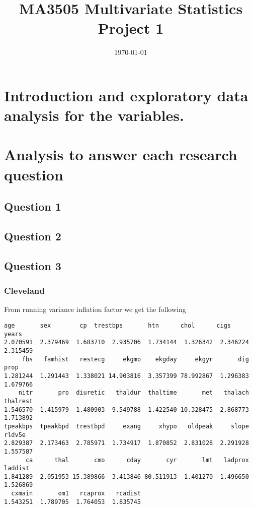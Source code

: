 \documentclass[a4paper]{article}
\title{MA3505 Multivariate Statistics Project 1}
\date{\today}
\begin{document}
\maketitle


\section{Introduction and exploratory data analysis for the variables.}


\section{Analysis to answer each research question}

\subsection{Question 1}


\subsection{Question 2}


\subsection{Question 3}

\subsubsection{Cleveland}

From running variance inflation factor we get the following

\begin{lstlisting}[frame=single]
     age       sex        cp  trestbps       htn      chol      cigs     years 
2.070591  2.379469  1.683710  2.935706  1.734144  1.326342  2.346224  2.315459 
     fbs   famhist   restecg     ekgmo    ekgday     ekgyr       dig      prop 
1.281244  1.291443  1.338021 14.903816  3.357399 78.992867  1.296383  1.679766 
    nitr       pro  diuretic   thaldur  thaltime       met   thalach  thalrest 
1.546570  1.415979  1.480903  9.549788  1.422540 10.328475  2.868773  1.713892 
tpeakbps  tpeakbpd  trestbpd     exang     xhypo   oldpeak     slope    rldv5e 
2.829387  2.173463  2.785971  1.734917  1.870852  2.831028  2.291928  1.557587 
      ca      thal       cmo      cday       cyr       lmt   ladprox   laddist 
1.841289  2.051953 15.389866  3.413846 80.511913  1.401270  1.496650  1.526869 
  cxmain       om1   rcaprox   rcadist 
1.543251  1.789705  1.764053  1.835745 
\end{lstlisting}
\end{document}
